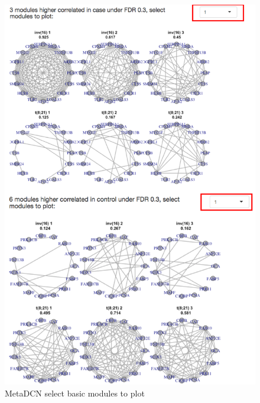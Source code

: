 \begin{figure}[H]
\begin{center}
\includegraphics[scale=0.45]{./figure/metaDCN/metaDCNBMplot.png}
\caption{MetaDCN select basic modules to plot}
\label{fig:metaDCNBMplot}
\end{center}
\end{figure}


